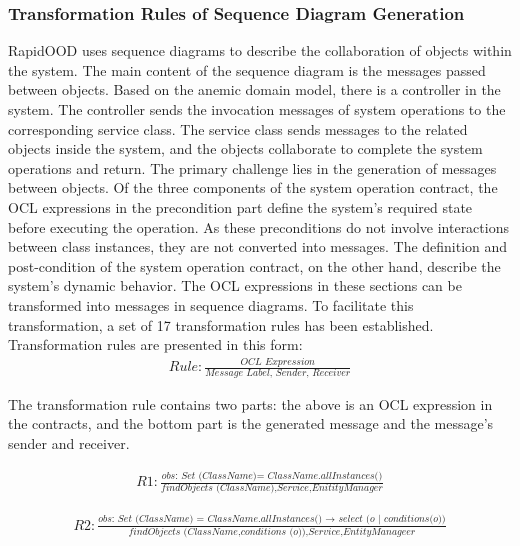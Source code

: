 \documentclass[pdflatex,sn-mathphys-num]{sn-jnl}%
\theoremstyle{thmstyleone}%
\theoremstyle{thmstyletwo}%
\theoremstyle{thmstylethree}%
\begin{document}
\subsubsection{Transformation Rules of Sequence Diagram Generation}
RapidOOD uses sequence diagrams to describe the collaboration of objects within the system. The main content of the sequence diagram is the messages passed between objects. Based on the anemic domain model, there is a controller in the system. The controller sends the invocation messages of system operations to the corresponding service class. The service class sends messages to the related objects inside the system, and the objects collaborate to complete the system operations and return.
The primary challenge lies in the generation of messages between objects. Of the three components of the system operation contract, the OCL expressions in the precondition part define the system's required state before executing the operation. As these preconditions do not involve interactions between class instances, they are not converted into messages. The definition and post-condition of the system operation contract, on the other hand, describe the system's dynamic behavior. The OCL expressions in these sections can be transformed into messages in sequence diagrams. To facilitate this transformation, a set of 17 transformation rules has been established. Transformation rules are presented in this form:
\[
\begin{array}{l}
    \textit{Rule}: \frac{\textit{OCL Expression}}{\textit{Message Label, Sender, Receiver}}
\end{array}
\]

The transformation rule contains two parts: the above is an OCL expression in the contracts, and the bottom part is the generated message and the message's sender and receiver.

\[
\begin{array}{l}
    \textit{R1}: \frac{\textit{obs: Set (ClassName)= ClassName.allInstances()}}{\textit{findObjects (ClassName),Service,EnitityManager}}
\end{array}
\]

\[
\begin{array}{l}
    \textit{R2}: \frac{\textit{obs: Set (ClassName) = ClassName.allInstances() → select (o $|$ conditions(o))}}{\textit{findObjects (ClassName,conditions (o)),Service,EntityManageer}}
\end{array}
\]
\end{document}
